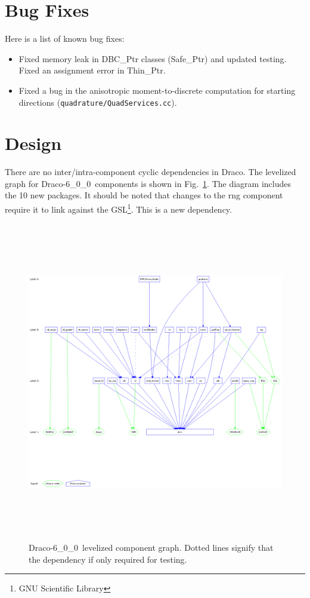 \documentclass[note]{ResearchNote}
\newcommand{\draco}{Draco}
\newcommand{\dracor}{\draco-6\_0\_0}
\begin{document}
\section{Bug Fixes}
Here is a list of known bug fixes:
\begin{itemize}
\item Fixed memory leak in \textsf{DBC\_Ptr} classes
  (\textsf{Safe\_Ptr}) and updated testing.  Fixed an assignment error
  in \textsf{Thin\_Ptr}.
\item Fixed a bug in the anisotropic moment-to-discrete computation
  for starting directions (\texttt{quadrature/QuadServices.cc}).
\end{itemize}


\section{Design}

There are no inter/intra-component cyclic dependencies in \draco.  The
levelized graph for \dracor\ components is shown in
Fig.~\ref{fig:level}.  The diagram includes the 10 new packages.  It
should be noted that changes to the \textsf{rng} component require it
to link against the \textsf{GSL}\footnote{GNU Scientific Library}.
This is a new dependency.
\begin{figure}
  \label{fig:level}
  \centerline{
    \includegraphics[height=5.5in]{level-6_0_0.ps}}
  \caption{\dracor\ levelized component graph.  Dotted lines signify
    that the dependency if only required for testing.}
\end{figure}
\end{document}
